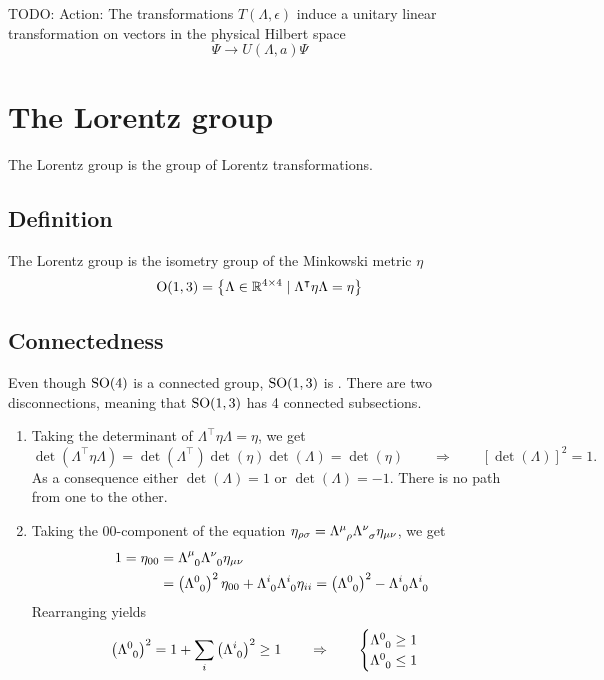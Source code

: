 TODO: Action: The transformations $T(\Lambda, \epsilon)$ induce a unitary linear transformation on vectors in the physical Hilbert space
\[ \Psi \to U(\Lambda,a)\Psi  \]

\section{The Lorentz group}
The Lorentz group is the group of Lorentz transformations.
\subsection{Definition}
\begin{definition}
The Lorentz group is the isometry group of the Minkowski metric $\eta$
\[ \operatorname{O}(1,3) = \left\{\Lambda \in \mathbb{R}^{4\times 4}\;|\;\Lambda^\intercal\eta\Lambda = \eta\right\} \]
\end{definition}

\subsection{Connectedness}
Even though $\operatorname{SO}(4)$ is a connected group, $\operatorname{SO}(1,3)$ is . There are two disconnections, meaning that $\operatorname{SO}(1,3)$ has 4 connected subsections. 

\begin{enumerate}
\item Taking the determinant of $\Lambda^\intercal\eta\Lambda = \eta$, we get
\[ \det(\Lambda^\intercal\eta\Lambda) = \det(\Lambda^\intercal)\det(\eta)\det(\Lambda) = \det(\eta) \qquad \Rightarrow \qquad \left[\det(\Lambda)\right]^2 = 1. \]
As a consequence either $\det(\Lambda) = 1$ or $\det(\Lambda) = -1$. There is no path from one to the other.
\item Taking the $00$-component of the equation $\eta_{\rho\sigma} = \tensor{\Lambda}{^\mu_\rho}\tensor{\Lambda}{^\nu_\sigma}\eta_{\mu\nu}$, we get
\begin{align*}
1 = \eta_{00} &= \tensor{\Lambda}{^\mu_{0}}\tensor{\Lambda}{^{\nu}_{0}}\eta_{\mu\nu} \\
&= \left(\tensor{\Lambda}{^{0}_{0}}\right)^2\eta_{00} + \tensor{\Lambda}{^{i}_{0}}\tensor{\Lambda}{^{i}_{0}}\eta_{ii} = \left(\tensor{\Lambda}{^{0}_{0}}\right)^2 - \tensor{\Lambda}{^{i}_{0}}\tensor{\Lambda}{^{i}_{0}}
\end{align*}
Rearranging yields
\[ \left(\tensor{\Lambda}{^0_{0}}\right)^2 = 1 + \sum_i \left(\tensor{\Lambda}{^i_{0}}\right)^2 \geq 1 \qquad\Rightarrow\qquad \begin{cases}
\tensor{\Lambda}{^{0}_{0}} \geq 1 \\
\tensor{\Lambda}{^{0}_{0}} \leq 1
\end{cases} \]
\end{enumerate}

